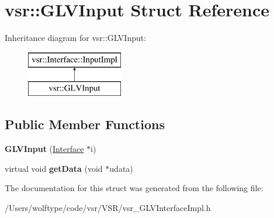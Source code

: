 \hypertarget{structvsr_1_1_g_l_v_input}{\section{vsr\-:\-:G\-L\-V\-Input Struct Reference}
\label{structvsr_1_1_g_l_v_input}
}
Inheritance diagram for vsr\-:\-:G\-L\-V\-Input\-:\begin{figure}[H]
\begin{center}
\leavevmode
\includegraphics[height=2.000000cm]{structvsr_1_1_g_l_v_input}
\end{center}
\end{figure}
\subsection*{Public Member Functions}
\begin{DoxyCompactItemize}
\item 
\hypertarget{structvsr_1_1_g_l_v_input_a27c2796999d7644c986e634ed3e14074}{{\bfseries G\-L\-V\-Input} (\hyperlink{classvsr_1_1_interface}{Interface} $\ast$i)}\label{structvsr_1_1_g_l_v_input_a27c2796999d7644c986e634ed3e14074}

\item 
\hypertarget{structvsr_1_1_g_l_v_input_ae5d9315465955928feb8d32d03859b04}{virtual void {\bfseries get\-Data} (void $\ast$udata)}\label{structvsr_1_1_g_l_v_input_ae5d9315465955928feb8d32d03859b04}

\end{DoxyCompactItemize}


The documentation for this struct was generated from the following file\-:\begin{DoxyCompactItemize}
\item 
/\-Users/wolftype/code/vsr/\-V\-S\-R/vsr\-\_\-\-G\-L\-V\-Interface\-Impl.\-h\end{DoxyCompactItemize}
